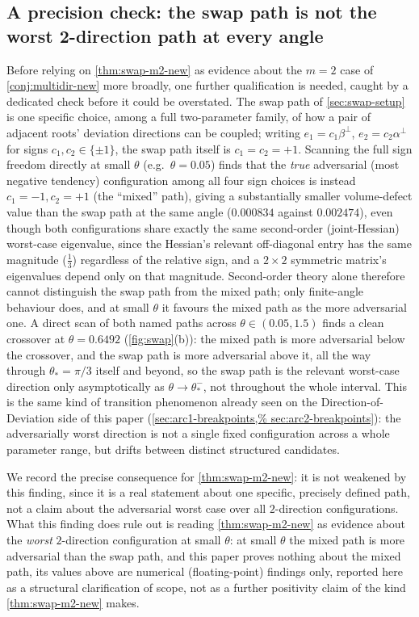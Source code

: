 \documentclass[11pt,reqno]{amsart}
\renewcommand{\_}{\origunderscore\allowbreak}
\numberwithin{equation}{section}
\theoremstyle{plain}
\theoremstyle{definition}
\theoremstyle{remark}
\begin{document}
\subsection{A precision check: the swap path is not the worst 2-direction path at every angle}\label{sec:swap-not-worst}

Before relying on \cref{thm:swap-m2-new} as evidence about the
$m=2$ case of \cref{conj:multidir-new} more broadly, one further
qualification is needed, caught by a dedicated check before it
could be overstated. The swap path of \cref{sec:swap-setup} is one
specific choice, among a full two-parameter family, of how a pair of
adjacent roots' deviation directions can be coupled; writing
$e_1=c_1\beta^\perp$, $e_2=c_2\alpha^\perp$ for signs
$c_1,c_2\in\{\pm1\}$, the swap path itself is $c_1=c_2=+1$. Scanning
the full sign freedom directly at small $\theta$ (e.g.\
$\theta=0.05$) finds that the \emph{true} adversarial (most negative
tendency) configuration among all four sign choices is instead
$c_1=-1,c_2=+1$ (the ``mixed'' path), giving a substantially smaller
volume-defect value than the swap path at the same angle
($0.000834$ against $0.002474$), even though both configurations
share exactly the same second-order (joint-Hessian) worst-case
eigenvalue, since the Hessian's relevant off-diagonal entry has the
same magnitude ($\tfrac13$) regardless of the relative sign, and a
$2\times2$ symmetric matrix's eigenvalues depend only on that
magnitude. Second-order theory alone therefore cannot
distinguish the swap path from the mixed path; only
finite-angle behaviour does, and at small $\theta$ it favours the
mixed path as the more adversarial one. A direct scan of both named
paths across $\theta\in(0.05,1.5)$ finds a clean crossover at
$\theta=0.6492$ (\cref{fig:swap}(b)): the mixed path is more adversarial below the
crossover, and the swap path is more adversarial above it, all the way
through $\theta_*=\pi/3$ itself and beyond, so the swap path is the
relevant worst-case direction only asymptotically as
$\theta\to\theta_*^-$, not throughout the whole interval. This is the
same kind of transition phenomenon already seen on the
Direction-of-Deviation side of this paper (\cref{sec:arc1-breakpoints,%
sec:arc2-breakpoints}): the adversarially worst direction is not a
single fixed configuration across a whole parameter range, but drifts
between distinct structured candidates.

We record the precise consequence for \cref{thm:swap-m2-new}: it is
not weakened by this finding, since it is a real statement about one
specific, precisely defined path, not a claim
about the adversarial worst case over all $2$-direction
configurations. What this finding does rule out is reading
\cref{thm:swap-m2-new} as evidence about the \emph{worst} $2$-direction
configuration at small $\theta$: at small $\theta$ the mixed path is
more adversarial than the swap path, and this paper proves nothing
about the mixed path, its values above are numerical
(floating-point) findings only, reported here as a structural
clarification of scope, not as a further positivity claim of the kind
\cref{thm:swap-m2-new} makes.
\end{document}
